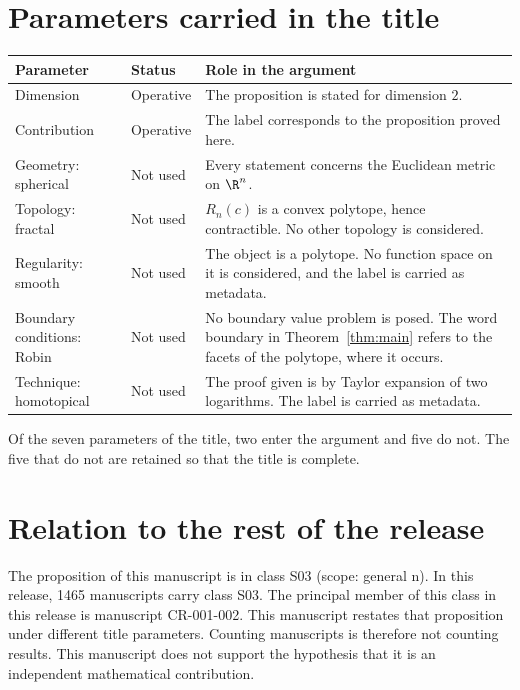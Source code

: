 \documentclass[11pt]{article}
\begin{document}
\section{Parameters carried in the title}\label{sec:params}
\begin{center}
\small
\begin{tabular}{p{}p{}p{}}
\toprule
Parameter & Status & Role in the argument \\
\midrule
Dimension & Operative & The proposition is stated for dimension $2$. \\
Contribution & Operative & The label corresponds to the proposition proved here. \\
Geometry: spherical & Not used & Every statement concerns the Euclidean metric on $\R^n$. \\
Topology: fractal & Not used & $R_n(c)$ is a convex polytope, hence contractible. No other topology is considered. \\
Regularity: smooth & Not used & The object is a polytope. No function space on it is considered, and the label is carried as metadata. \\
Boundary conditions: Robin & Not used & No boundary value problem is posed. The word boundary in Theorem~\ref{thm:main} refers to the facets of the polytope, where it occurs. \\
Technique: homotopical & Not used & The proof given is by Taylor expansion of two logarithms. The label is carried as metadata. \\
\bottomrule
\end{tabular}
\end{center}
Of the seven parameters of the title, two enter the argument and five do not. The five that do not are retained so that the title is complete.

\section{Relation to the rest of the release}
The proposition of this manuscript is in class S03 (scope: general n).
In this release, 1465 manuscripts carry class S03. The principal member of this class in this release is manuscript CR-001-002. This manuscript restates that proposition under different title parameters.
Counting manuscripts is therefore not counting results. This manuscript does not support the hypothesis that it is an independent mathematical contribution.
\end{document}
